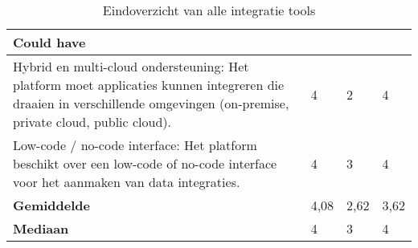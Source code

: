 \begin{landscape}
\begin{table}[H]
{\begin{tabular}{|llll|}
\textbf{Could have}                                                                                                                                                                                                        &                                     &                                      &                       \\ \hline
\multicolumn{1}{|l|}{Hybrid en multi-cloud ondersteuning: Het platform moet applicaties kunnen integreren die draaien in verschillende omgevingen (on-premise, private cloud, public cloud).}                              & \multicolumn{1}{l|}{4}              & \multicolumn{1}{l|}{2}               & 4                     \\ \hline
\multicolumn{1}{|l|}{Low-code / no-code interface: Het platform beschikt over een low-code of no-code interface voor het aanmaken van data integraties.}                                                                   & \multicolumn{1}{l|}{4}              & \multicolumn{1}{l|}{3}               & 4                     \\ \hline
\multicolumn{1}{|l|}{\textbf{Gemiddelde}}                                                                                                                                                                                  & \multicolumn{1}{l|}{4,08}              & \multicolumn{1}{l|}{2,62}               & 3,62                     \\ \hline
\multicolumn{1}{|l|}{\textbf{Mediaan}}                                                                                                                                                                                     & \multicolumn{1}{l|}{4}              & \multicolumn{1}{l|}{3}               & 4                     \\ \hline
\end{tabular}
}
\caption{Eindoverzicht van alle integratie tools}
\end{table}

\end{landscape}